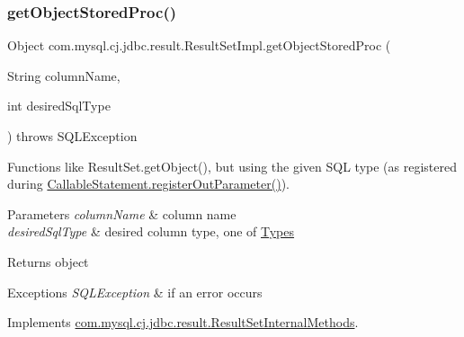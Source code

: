 \subsubsection{\texorpdfstring{get\+Object\+Stored\+Proc()}{getObjectStoredProc()}\hspace{0.1cm}{\footnotesize\ttfamily [3/4]}}
{\footnotesize\ttfamily Object com.\+mysql.\+cj.\+jdbc.\+result.\+Result\+Set\+Impl.\+get\+Object\+Stored\+Proc (\begin{DoxyParamCaption}\item[{String}]{column\+Name,  }\item[{int}]{desired\+Sql\+Type }\end{DoxyParamCaption}) throws S\+Q\+L\+Exception}

Functions like Result\+Set.\+get\+Object(), but using the given S\+QL type (as registered during \mbox{\hyperlink{classcom_1_1mysql_1_1cj_1_1jdbc_1_1_callable_statement_affc71b6220a237feb94f842a2347d1da}{Callable\+Statement.\+register\+Out\+Parameter()}}).


\begin{DoxyParams}{Parameters}
{\em column\+Name} & column name \\
\hline
{\em desired\+Sql\+Type} & desired column type, one of \mbox{\hyperlink{}{Types}} \\
\hline
\end{DoxyParams}
\begin{DoxyReturn}{Returns}
object 
\end{DoxyReturn}

\begin{DoxyExceptions}{Exceptions}
{\em S\+Q\+L\+Exception} & if an error occurs \\
\hline
\end{DoxyExceptions}


Implements \mbox{\hyperlink{interfacecom_1_1mysql_1_1cj_1_1jdbc_1_1result_1_1_result_set_internal_methods_a403c7181f28d44398e8ba4865edf8fb0}{com.\+mysql.\+cj.\+jdbc.\+result.\+Result\+Set\+Internal\+Methods}}.

\mbox{\label{classcom_1_1mysql_1_1cj_1_1jdbc_1_1result_1_1_result_set_impl_aa9d0a1c264c70954b3fbc1f81f0e7a9b}} 
